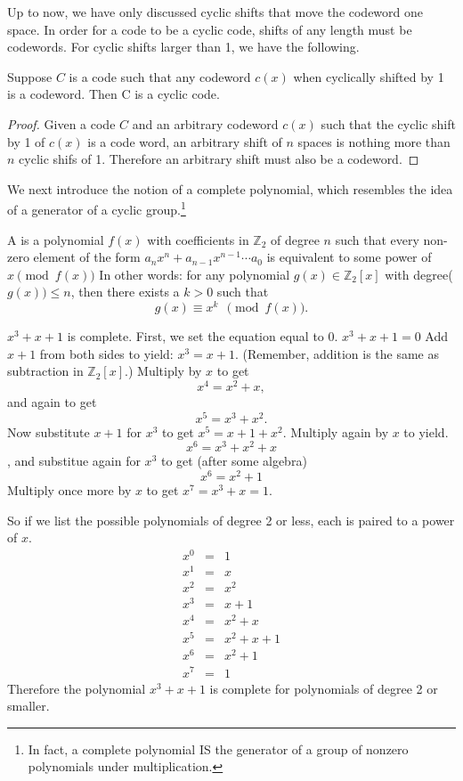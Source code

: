 Up to now, we have only discussed cyclic shifts that move the codeword one space.  In order for a code to be a cyclic code, shifts of any length must be codewords.  For cyclic shifts larger than 1, we have the following.

\begin {prop}{}
Suppose $C$ is a code such that any codeword $c(x)$ when cyclically shifted by 1 is a codeword. Then C is a cyclic code.
\end {prop}
\begin {proof}
Given a code $C$ and an arbitrary codeword $c(x)$ such that the cyclic shift by 1 of $c(x)$ is a code word, an arbitrary shift of $n$ spaces is nothing more than $n$ cyclic shifs of 1.  Therefore an arbitrary shift must also be a codeword.
\end {proof}

We next introduce the notion of a complete polynomial, which resembles the idea of a generator of a cyclic group.\footnote{In fact, a complete polynomial IS the generator of a group of nonzero polynomials under multiplication.} 

\begin{defn}
A   is a polynomial $f(x)$ with coefficients in $\mathbb{Z}_2$ of degree $n$ such that every non-zero element of the form $a_nx^n + a_{n-1}x^{n-1} \cdots a_0$ is equivalent to some power of $x  \pmod{f(x)}$  In other words: for any polynomial $g(x) \in  
\mathbb{Z}_2[x]$ with degree($g(x)) \le n$, then there exists a $k >0$ such that
\[ g(x) \equiv x^k~~\pmod{f(x)}. \]
\end{defn}

\begin {example}{}
$x^3 + x + 1$ is complete.  First, we set the equation equal to 0. $x^3 + x + 1=0$ Add $x+1$ from both sides to yield: $x^3 = x+1$. (Remember, addition is the same as subtraction in $\mathbb{Z}_2[x]$.) Multiply by $x$ to get
\[x^4 = x^2 + x,\]
and again to get
\[x^5 = x^3 + x^2.\] 
Now substitute $x+1$ for $x^3$ to get $x^5 = x + 1 + x^2$. Multiply again by $x$ to yield.
\[x^6 = x^3 + x^2 + x\], 
and substitue again for $x^3$ to get (after some algebra)
\[x^6 = x^2 + 1\]
Multiply once more by $x$ to get $x^7 = x^3 + x = 1.$

So if we list the possible polynomials of degree 2 or less, each is paired to a power of $x$.
\[
\begin{array}{lcr}
x^0 & = & 1 \\
x^1 & = & x \\ 
x^2 & = & x^2 \\ 
x^3 & = & x+1 \\ 
x^4 & = & x^2 + x \\ 
x^5 & = & x^2 + x + 1 \\ 
x^6 & = & x^2 + 1 \\ 
x^7 & = & 1 
\end{array}\]
Therefore the polynomial $x^3 + x + 1$ is complete for polynomials of degree 2 or smaller.  
\end {example}

